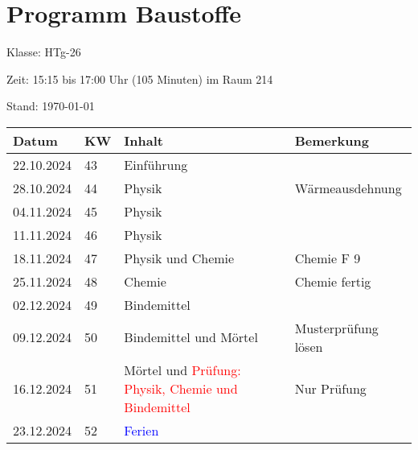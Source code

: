 \documentclass[
11pt,
captions=tableheading,
headings=big,
headsepline,
footsepline, 
captions=tableheading,
parskip=half-,
]{scrartcl}
\title{\fach}
\date{2024}
\newcommand{\klasse}{HTg-26\xspace}
\newcommand{\red}[1]{\textcolor{red}{#1}}
\begin{document}
\section*{Programm Baustoffe}

Klasse: \klasse

Zeit: 15:15 bis 17:00 Uhr (105 Minuten) im Raum 214



Stand: \today

\vspace{1cm}



\begin{table}[H]
    \centering
    \begin{tabular}{llp{8cm}p{4cm}}
        \toprule
        \textbf{Datum} & \textbf{KW} & \textbf{Inhalt}                                          & \textbf{Bemerkung}  \\
        \midrule
        22.10.2024     & 43          & Einführung                                               & {}                  \\
        28.10.2024     & 44          & Physik                                                   & Wärmeausdehnung     \\
        04.11.2024     & 45          & Physik                                                   & {}                  \\
        11.11.2024     & 46          & Physik                                                   & {}                  \\
        18.11.2024     & 47          & Physik und Chemie                                        & Chemie F 9          \\
        25.11.2024     & 48          & Chemie                                                   & Chemie fertig       \\
        02.12.2024     & 49          & Bindemittel                                              & {}                  \\
        09.12.2024     & 50          & Bindemittel und Mörtel                                   & Musterprüfung lösen \\
        16.12.2024     & 51          & Mörtel und \red{Prüfung: Physik, Chemie und Bindemittel} & Nur Prüfung         \\
        \midrule
        23.12.2024     & 52          & \textcolor{blue}{Ferien}                                                       \\
        \midrule

\end{tabular}
\end{table}
\end{document}
